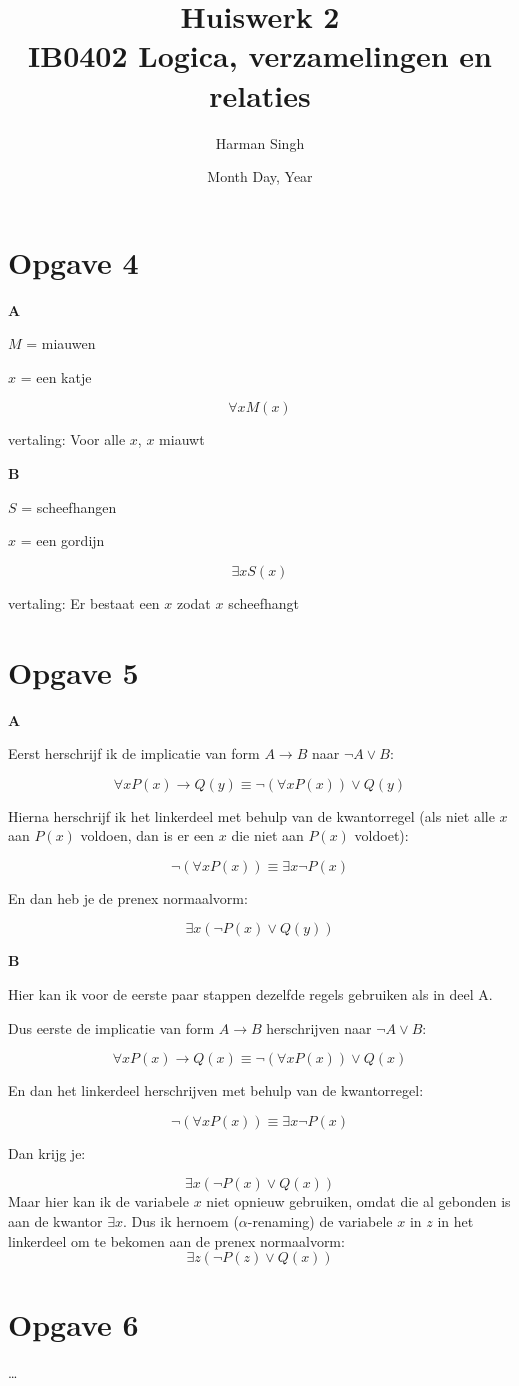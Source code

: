 \documentclass[11pt, a4paper]{article}
\title{Huiswerk 2 \\ IB0402 Logica, verzamelingen en relaties}
\author{Harman Singh}
\date{Month Day, Year}
\begin{document}
\maketitle

\pagebreak
\section*{Opgave 4}
\textbf{A}

$M$ = miauwen

$x$ = een katje

\[
\forall x M(x)
\]

vertaling: Voor alle $x$, $x$ miauwt


\textbf{B}

$S$ = scheefhangen 

$x$ = een gordijn

\[
\exists x S(x)
\]

vertaling: Er bestaat een $x$ zodat $x$ scheefhangt



\pagebreak
\section*{Opgave 5}

\textbf{A}

Eerst herschrijf ik de implicatie van form $A \rightarrow B$ naar $\neg A \lor B$:

\[
\forall x P(x) \rightarrow Q(y) \equiv \neg ( \forall x P(x)) \lor Q(y)
\]

Hierna herschrijf ik het linkerdeel met behulp van de kwantorregel (als niet alle $x$ aan $P(x)$ voldoen, dan is er een $x$ die niet aan $P(x)$ voldoet):

\[
\neg ( \forall x P(x)) \equiv \exists x \neg P(x)
\]

En dan heb je de prenex normaalvorm:

\[
\exists x ( \neg P(x) \lor Q(y) )
\]


\textbf{B}

Hier kan ik voor de eerste paar stappen dezelfde regels gebruiken als in deel A.

Dus eerste de implicatie van form $A \rightarrow B$ herschrijven naar $\neg A \lor B$:

\[
\forall x P(x) \rightarrow Q(x) \equiv \neg ( \forall x P(x)) \lor Q(x)
\]

En dan het linkerdeel herschrijven met behulp van de kwantorregel:

\[
\neg ( \forall x P(x)) \equiv \exists x \neg P(x)
\]

Dan krijg je:

\[
\exists x ( \neg P(x) \lor Q(x) )
\]
Maar hier kan ik de variabele $x$ niet opnieuw gebruiken, omdat die al gebonden is aan de kwantor $\exists x$.
Dus ik hernoem ($\alpha$-renaming) de variabele $x$ in $z$ in het linkerdeel om te bekomen aan de prenex normaalvorm:
\[
\exists z ( \neg P(z) \lor Q(x) )
\]



\pagebreak
\section*{Opgave 6}

\ldots
\end{document}
